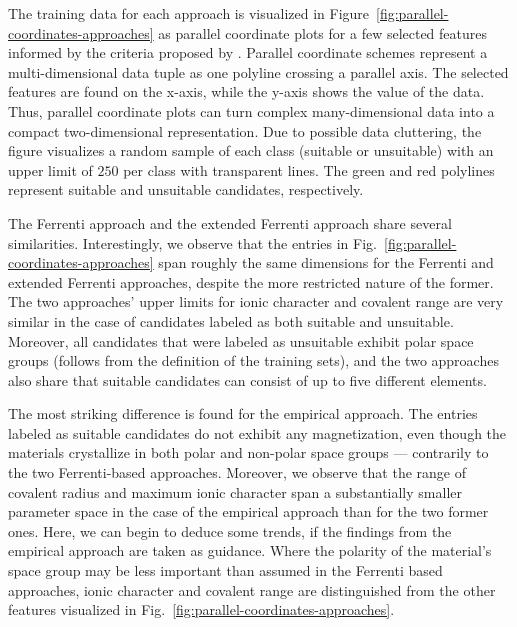 \documentclass[superscriptaddress,unsortedaddress,
 amsmath,amssymb,
 aps,
]{revtex4-2}
\begin{document}
The training data for each approach is visualized in Figure~\ref{fig:parallel-coordinates-approaches} as parallel coordinate plots for a few selected features informed by the criteria proposed by \citeauthor{Weber2010} \cite{Weber2010}. Parallel coordinate schemes  \cite{Inselberga1990, Inselberg1985} represent a multi-dimensional data tuple as one polyline crossing a parallel axis. The selected features are found on the x-axis, while the y-axis shows the value of the data. Thus, parallel coordinate plots can turn complex many-dimensional data into a compact  two-dimensional representation. Due to possible data cluttering, the figure visualizes a random sample of each class (suitable or unsuitable) with an upper limit of $250$ per class with transparent lines. The green and red polylines represent suitable and unsuitable candidates, respectively. 

The Ferrenti approach and the extended Ferrenti approach share several similarities. 
Interestingly, we observe that the entries in  Fig.~\ref{fig:parallel-coordinates-approaches} span roughly the same dimensions for the Ferrenti and extended Ferrenti approaches, despite the more restricted nature of the former.  
The two approaches' upper limits for ionic character and covalent range are very similar in the case of candidates labeled as both suitable and unsuitable.   
Moreover, all candidates that were labeled as unsuitable exhibit polar space groups (follows from the definition of the training sets), and the two approaches also share that suitable candidates can consist of up to five different elements. 

The most striking difference is found for the empirical approach. The entries labeled as suitable candidates do not exhibit any magnetization, even though the materials crystallize in both polar and non-polar space groups --- contrarily to the two Ferrenti-based approaches. Moreover, we observe that the range of covalent radius and maximum ionic character span a substantially smaller parameter space in the case of the empirical approach than for the two former ones.  
Here, we can begin to deduce some trends, if the findings from the empirical approach are taken as guidance. Where the polarity of the material's space group may be less important than assumed in the Ferrenti based approaches, ionic character and covalent range are distinguished from the other features visualized in Fig.~\ref{fig:parallel-coordinates-approaches}. 
\end{document}
